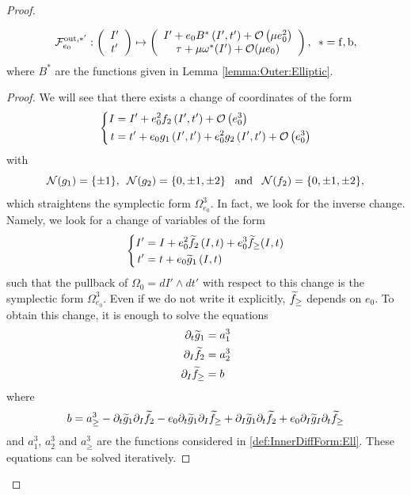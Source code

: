 \begin{proof}
\begin{lemma}
\begin{itemize}
    \begin{equation}\label{def:OuterMap:ell:straightening}
      \mathcal{F}_{e_0}^{\mathrm{out},\ast'}:\left(\begin{array}{c} I'\\
          t'
        \end{array}\right)\mapsto \left(\begin{array}{c}  I'+e_0 B^\ast \left(I', t'\right)+\mathcal{O}\left(\mu e_0^2\right)\\
          \tau+\mu\omega^\ast(I')+\mathcal{O}(\mu e_0)
        \end{array}\right),\,\,\,\ast=\mathrm{f},\mathrm{b},
    \end{equation}
where $B^\ast$ are the functions given in Lemma \ref{lemma:Outer:Elliptic}.
\end{itemize}
\end{lemma}
\begin{proof}
We will see that there exists a change of coordinates of the form
\begin{equation}\label{eq:StraighteningOmega:Change}
\left\{\begin{split}
        I&= I'+e_0^2 f_2\left(I',t'\right)+\mathcal{O}\left(e_0^3\right)\\
        t&= t'+e_0 g_1\left(I',t'\right)+e_0^2 g_2\left(I',t'\right)+\mathcal{O}\left(e_0^3\right)
       \end{split}\right.
\end{equation}
with
\begin{equation}\label{eq:StraighteningOmega:Change:harmonics}
 \mathcal{N}(g_1)=\{\pm 1\},\,\,\, \mathcal{N}(g_2)=\{0,\pm 1,\pm 2\}\,\,\,\text{ and }\,\,\,\mathcal{N}(f_2)=\{0,\pm 1,\pm 2\},
\end{equation}
which straightens the symplectic form $\Omega_{e_0}^{3}$. In fact, we look for the inverse change. Namely, we look for a change of variables of the form
\begin{equation}\label{eq:StraighteningOmega:Invers}
\left\{\begin{split}
        I'&= I+e_0^2 \widetilde f_2\left(I,t\right)+e_0^3\widetilde f_\geq (I,t)\\
        t'&= t+e_0 \widetilde g_1\left(I,t\right)
       \end{split}\right.
\end{equation}
such that the pullback of $\Omega_0=dI'\wedge dt'$ with respect to this change is the symplectic form $\Omega_{e_0}^{3}$. Even if we do not write it explicitly, $\widetilde f_\geq$ depends on $e_0$. To obtain this change, it is enough to solve the equations
\[
 \begin{split}
  \partial_t \widetilde g_1&=a_1^3\\
  \partial_I \widetilde f_2&=a_2^3\\
  \partial_I \widetilde f_\geq& =b
 \end{split}
\]
where
\[
 b=a_{\geq}^3-\partial_t \widetilde g_1 \partial_I\widetilde f_2-e_0 \partial_t\widetilde g_1\partial_I\widetilde f_\geq+\partial_I\widetilde g_1 \partial_t \widetilde f_2+e_0\partial_I \widetilde g_I\partial_t \widetilde f_\geq
\]
and $a_1^3$, $a_2^3$ and $a_\geq^3$ are the functions considered in \eqref{def:InnerDiffForm:Ell}. These equations can be solved iteratively.


\end{proof}
\end{proof}
